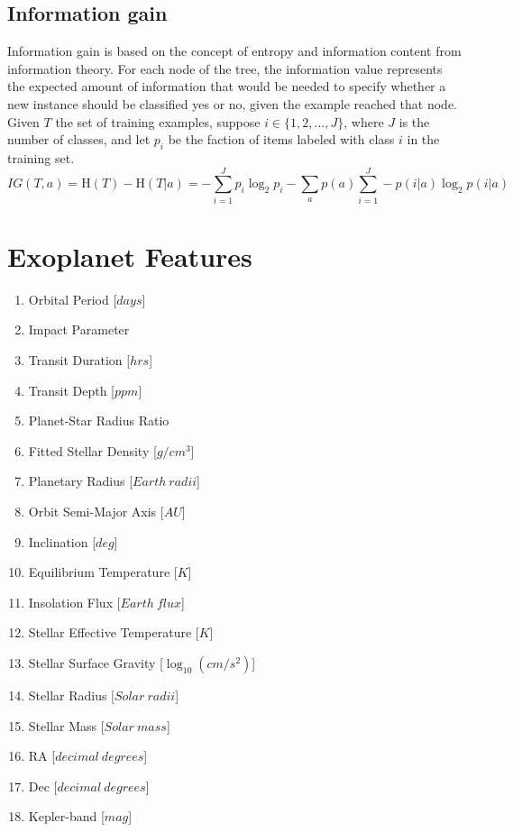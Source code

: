 \documentclass[11pt, a4paper]{article}
\begin{document}
  \subsection{Information gain}
    Information gain is based on the concept of entropy and information content from information theory. For each node of the tree, the information value represents the expected amount of information that would be needed to specify whether a new instance should be classified yes or no, given the example reached that node. Given $T$ the set of training examples, suppose $i\in\{1,2,...,J\}$, where $J$ is the number of classes, and let $p_{i}$ be the faction of items labeled with class $i$ in the training set.
    \[IG(T, a)=\mathrm{H}(T)-\mathrm{H}(T|a)=-\sum _{i=1}^{J}p_{i}\log _{2}{p_{i}}-\sum _{a}{p(a)\sum _{i=1}^{J}-p(i|a)\log _{2}{p(i|a)}}\]

\section{Exoplanet Features}
  \label{appendix:features}
  \begin{multicols}{2}
    \begin{enumerate}
      \item Orbital Period [$days$]
      \item Impact Parameter
      \item Transit Duration [$hrs$]
      \item Transit Depth [$ppm$]
      \item Planet-Star Radius Ratio
      \item Fitted Stellar Density [$g/cm^{3}$]
      \item Planetary Radius [$Earth\:radii$]
      \item Orbit Semi-Major Axis [$AU$]
      \item Inclination [$deg$]
      \item Equilibrium Temperature [$K$]
      \item Insolation Flux [$Earth\:flux$]
      \item Stellar Effective Temperature [$K$]
      \item Stellar Surface Gravity [$\log_{10}(cm/s^{2})$]
      \item Stellar Radius [$Solar\:radii$]
      \item Stellar Mass [$Solar\:mass$]
      \item RA [$decimal\:degrees$]
      \item Dec [$decimal\:degrees$]
      \item Kepler-band [$mag$]
    \end{enumerate}
  \end{multicols}



\end{document}
